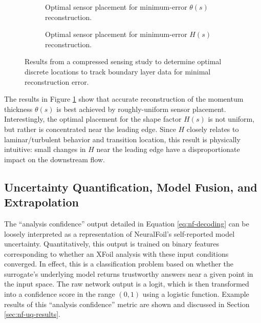     \begin{figure}[H]
        \centering
        \begin{subfigure}[t]{0.49\textwidth}
            \centering
            
            \caption{Optimal sensor placement for minimum-error $\theta(s)$ reconstruction.}
        \end{subfigure}
        \begin{subfigure}[t]{0.49\textwidth}
            \centering
            
            \caption{Optimal sensor placement for minimum-error $H(s)$ reconstruction.}
        \end{subfigure}
        \caption{Results from a compressed sensing study to determine optimal discrete locations to track boundary layer data for minimal reconstruction error.}
        \label{fig:optimal_sensor_placement}
    \end{figure}

    The results in Figure \ref{fig:optimal_sensor_placement} show that accurate reconstruction of the momentum thickness $\theta(s)$ is best achieved by roughly-uniform sensor placement. Interestingly, the optimal placement for the shape factor $H(s)$ is not uniform, but rather is concentrated near the leading edge. Since $H$ closely relates to laminar/turbulent behavior and transition location, this result is physically intuitive: small changes in $H$ near the leading edge have a disproportionate impact on the downstream flow.

    \subsection{Uncertainty Quantification, Model Fusion, and Extrapolation}
    \label{sec:nf-uq}

    The ``analysis confidence'' output detailed in Equation \ref{eq:nf-decoding} can be loosely interpreted as a representation of NeuralFoil's self-reported model uncertainty. Quantitatively, this output is trained on binary features corresponding to whether an XFoil analysis with these input conditions converged. In effect, this is a classification problem based on whether the surrogate's underlying model returns trustworthy answers near a given point in the input space. The raw network output is a logit, which is then transformed into a confidence score in the range $(0, 1)$ using a logistic function. Example results of this ``analysis confidence'' metric are shown and discussed in Section \ref{sec:nf-uq-results}.

